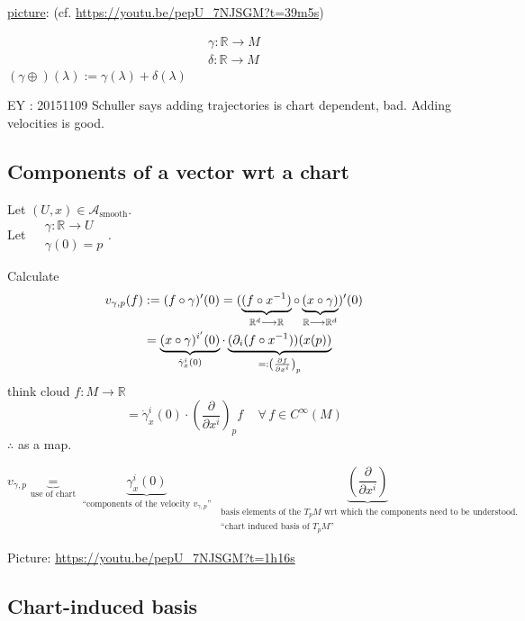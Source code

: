 \underline{picture}: (cf. \url{https://youtu.be/pepU_7NJSGM?t=39m5s})

\[
\begin{aligned} 
  \gamma : \mathbb{R} \to M \\
  \delta : \mathbb{R} \to M \end{aligned}
\]
$(\gamma \oplus)(\lambda) := \gamma(\lambda) + \delta(\lambda)$

EY : 20151109 Schuller says adding trajectories is chart dependent, bad. Adding velocities is good.  
\subsection{Components of a vector wrt a chart}

\begin{definition}
  Let $(U,x) \in \mathcal{A}_{\text{smooth}}$.  \\
  Let $\begin{aligned} & \gamma : \mathbb{R} \to U \\ 
    & \gamma(0) = p \end{aligned}$.  

Calculate 
\[
\begin{aligned} 
  v_{\gamma,p}(f) & := (f \circ \gamma)'(0) = (\underbrace{ (f\circ x^{-1}) }_{\mathbb{R}^d \longrightarrow \mathbb{R} }  \circ \underbrace{ (x\circ \gamma)}_{\mathbb{R} \longrightarrow \mathbb{R}^d}  )'(0) \\
  & = \underbrace{ (x\circ \gamma)^{i'}(0) }_{\dot{\gamma}_x^i(0) }  \cdot \underbrace{ (\partial_i(f\circ x^{-1} ) )(x(p))  }_{ =: \left( \frac{ \partial f}{ \partial x^i } \right)_p }
\end{aligned}
\]
think cloud $f:M\to \mathbb{R}$
\[
 = \boxed{ \dot{\gamma}_x^i(0) \cdot \left( \frac{ \partial }{ \partial x^i} \right)_p } f \quad \, \forall \, f \in C^{\infty}(M)
\]
$\therefore$ as a map.  

\[
v_{\gamma,p} \underbrace{=}_{\text{use of chart} } \underbrace{ \gamma_x^i(0) }_{ \text{ ``components of the velocity $v_{\gamma,p}$'' } } \underbrace{ \left( \frac{ \partial }{ \partial x^i} \right)}_{ \substack{ \text{ basis elements of the $T_pM$ wrt which the components need to be understood.} \\
\text{ ``chart induced basis of $T_pM$''} } } 
\]
\end{definition}

Picture: \url{https://youtu.be/pepU_7NJSGM?t=1h16s}

\subsection{Chart-induced basis}

